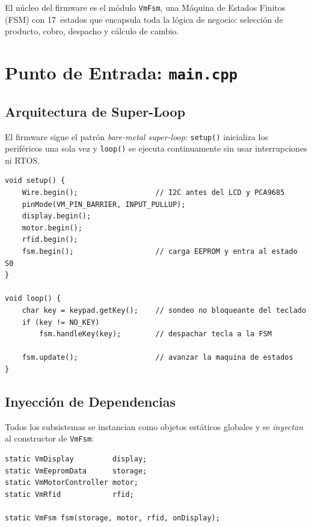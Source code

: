 \documentclass[12pt,a4paper]{article}
\begin{document}
El núcleo del firmware es el módulo \texttt{VmFsm}, una Máquina de Estados
Finitos (FSM) con 17~estados que encapsula toda la lógica de negocio:
selección de producto, cobro, despacho y cálculo de cambio.

\section{Punto de Entrada: \texttt{main.cpp}}

\subsection{Arquitectura de Super-Loop}

El firmware sigue el patrón \emph{bare-metal super-loop}: \texttt{setup()}
inicializa los periféricos una sola vez y \texttt{loop()} se ejecuta
continuamente sin usar interrupciones ni RTOS.

\begin{lstlisting}[style=cpp, caption={Núcleo del super-loop en main.cpp}]
void setup() {
    Wire.begin();                  // I2C antes del LCD y PCA9685
    pinMode(VM_PIN_BARRIER, INPUT_PULLUP);
    display.begin();
    motor.begin();
    rfid.begin();
    fsm.begin();                   // carga EEPROM y entra al estado S0
}

void loop() {
    char key = keypad.getKey();    // sondeo no bloqueante del teclado
    if (key != NO_KEY)
        fsm.handleKey(key);        // despachar tecla a la FSM

    fsm.update();                  // avanzar la maquina de estados
}
\end{lstlisting}

\subsection{Inyección de Dependencias}

Todos los subsistemas se instancian como objetos estáticos globales y se
\emph{inyectan} al constructor de \texttt{VmFsm}:

\begin{lstlisting}[style=cpp, caption={Instanciación e inyección en main.cpp}]
static VmDisplay         display;
static VmEepromData      storage;
static VmMotorController motor;
static VmRfid            rfid;

static VmFsm fsm(storage, motor, rfid, onDisplay);
\end{lstlisting}
\end{document}
